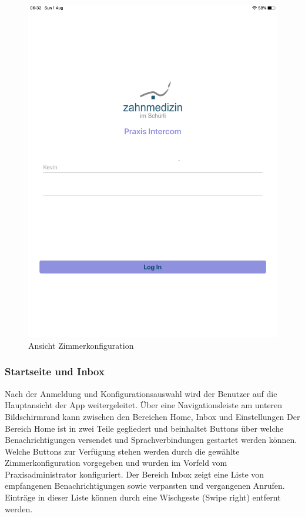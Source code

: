 \begin{figure}[h]
\begin{minipage}[b]{0.4\textwidth}
        \includegraphics[width=\textwidth]{graphics/screenshots/placeholder}
        \caption{Ansicht Zimmerkonfiguration}
    \end{minipage}
    \label{fig:MobileClient-Screens1}
\end{figure}

\clearpage

\subsubsection*{Startseite und Inbox}

Nach der Anmeldung und Konfigurationsauswahl wird der Benutzer auf die Hauptansicht der App weitergeleitet.
Über eine Navigationsleiste am unteren Bildschirmrand kann zwischen den Bereichen Home, Inbox und Einstellungen
Der Bereich Home ist in zwei Teile gegliedert und beinhaltet Buttons über welche Benachrichtigungen versendet und Sprachverbindungen gestartet werden können.
Welche Buttons zur Verfügung stehen werden durch die gewählte Zimmerkonfiguration vorgegeben und wurden im Vorfeld vom Praxisadministrator konfiguriert.
Der Bereich Inbox zeigt eine Liste von empfangenen Benachrichtigungen sowie verpassten und vergangenen Anrufen.
Einträge in dieser Liste können durch eine Wischgeste (Swipe right) entfernt werden.

